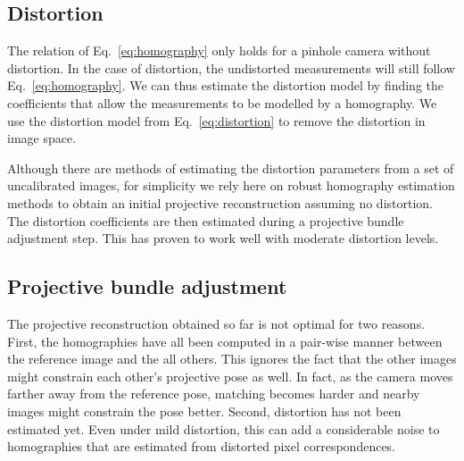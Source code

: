 \documentclass[10pt,twocolumn,letterpaper]{article}
\begin{document}
\subsection{Distortion}
\label{sec:planar:distortion}

The relation of Eq.~\eqref{eq:homography} only holds for a pinhole camera without distortion. In the case of distortion, the undistorted measurements will still follow Eq.~\eqref{eq:homography}. We can thus estimate the distortion model by finding the coefficients that allow the measurements to be modelled by a homography. We use the distortion model from Eq.~\eqref{eq:distortion} to remove the distortion in image space.

Although there are methods of estimating the distortion parameters from a set of uncalibrated images, for simplicity we rely here on robust homography estimation methods \cite{hartley2003} to obtain an initial projective reconstruction assuming no distortion. The distortion coefficients are then estimated during a projective bundle adjustment step. This has proven to work well with moderate distortion levels.

\subsection{Projective bundle adjustment}
\label{sec:projective:ba}

The projective reconstruction obtained so far is not optimal for two reasons. First, the homographies have all been computed in a pair-wise manner between the reference image and the all others. This ignores the fact that the other images might constrain each other's projective pose as well. In fact, as the camera moves farther away from the reference pose, matching becomes harder and nearby images might constrain the pose better. Second, distortion has not been estimated yet. Even under mild distortion, this can add a considerable noise to homographies that are estimated from distorted pixel correspondences.
\end{document}
